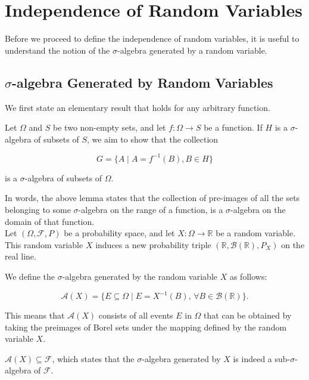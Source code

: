 \section{Independence of Random Variables}

Before we proceed to define the independence of random variables, it is useful to understand the notion of the $\sigma$-algebra generated by a random variable.

\subsection{$\sigma$-algebra Generated by Random Variables}

We first state an elementary result that holds for any arbitrary function.

\begin{lemma}
    Let \(\Omega\) and \(S\) be two non-empty sets, and let \(f: \Omega \to S\) be a function. If \(H\) is a \(\sigma\)-algebra of subsets of \(S\), we aim to show that the collection 

\[
G = \{ A \mid A = f^{-1}(B), B \in H \}
\]

is a \(\sigma\)-algebra of subsets of \(\Omega\).
\end{lemma}

In words, the above lemma states that the collection of pre-images of all the sets belonging to some $\sigma$-algebra on the range of a function, is a $\sigma$-algebra on the domain of that function.\\

Let \((\Omega, \mathcal{F}, P)\) be a probability space, and let \(X: \Omega \to \mathbb{R}\) be a random variable. This random variable \(X\) induces a new probability triple \((\mathbb{R}, \mathcal{B}(\mathbb{R}), P_X)\) on the real line.\\

\begin{definition}
    We define the \(\sigma\)-algebra generated by the random variable \(X\) as follows:

\[
\mathcal{A}(X) = \{E \subseteq \Omega \mid E = X^{-1}(B), \, \forall B \in \mathcal{B}(\mathbb{R})\}.
\]
\end{definition}

This means that \(\mathcal{A}(X)\) consists of all events \(E\) in \(\Omega\) that can be obtained by taking the preimages of Borel sets under the mapping defined by the random variable \(X\).

\begin{lemma}
    \(\mathcal{A}(X) \subseteq \mathcal{F}\), which states that the \(\sigma\)-algebra generated by \(X\) is indeed a sub-\(\sigma\)-algebra of \(\mathcal{F}\).
\end{lemma}

